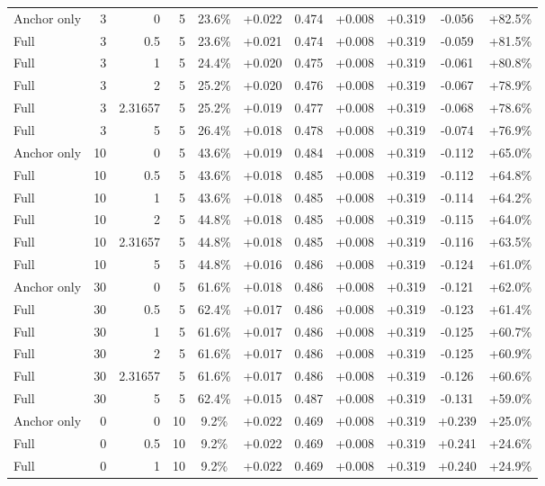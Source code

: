 \begin{table}[htbp]
\begin{tabular}{lrrrccccccc}
Anchor only & 3 & 0 & 5 & 23.6\% & +0.022 & 0.474 & +0.008 & +0.319 & -0.056 & +82.5\% \\
Full & 3 & 0.5 & 5 & 23.6\% & +0.021 & 0.474 & +0.008 & +0.319 & -0.059 & +81.5\% \\
Full & 3 & 1 & 5 & 24.4\% & +0.020 & 0.475 & +0.008 & +0.319 & -0.061 & +80.8\% \\
Full & 3 & 2 & 5 & 25.2\% & +0.020 & 0.476 & +0.008 & +0.319 & -0.067 & +78.9\% \\
Full & 3 & 2.31657 & 5 & 25.2\% & +0.019 & 0.477 & +0.008 & +0.319 & -0.068 & +78.6\% \\
Full & 3 & 5 & 5 & 26.4\% & +0.018 & 0.478 & +0.008 & +0.319 & -0.074 & +76.9\% \\
Anchor only & 10 & 0 & 5 & 43.6\% & +0.019 & 0.484 & +0.008 & +0.319 & -0.112 & +65.0\% \\
Full & 10 & 0.5 & 5 & 43.6\% & +0.018 & 0.485 & +0.008 & +0.319 & -0.112 & +64.8\% \\
Full & 10 & 1 & 5 & 43.6\% & +0.018 & 0.485 & +0.008 & +0.319 & -0.114 & +64.2\% \\
Full & 10 & 2 & 5 & 44.8\% & +0.018 & 0.485 & +0.008 & +0.319 & -0.115 & +64.0\% \\
Full & 10 & 2.31657 & 5 & 44.8\% & +0.018 & 0.485 & +0.008 & +0.319 & -0.116 & +63.5\% \\
Full & 10 & 5 & 5 & 44.8\% & +0.016 & 0.486 & +0.008 & +0.319 & -0.124 & +61.0\% \\
Anchor only & 30 & 0 & 5 & 61.6\% & +0.018 & 0.486 & +0.008 & +0.319 & -0.121 & +62.0\% \\
Full & 30 & 0.5 & 5 & 62.4\% & +0.017 & 0.486 & +0.008 & +0.319 & -0.123 & +61.4\% \\
Full & 30 & 1 & 5 & 61.6\% & +0.017 & 0.486 & +0.008 & +0.319 & -0.125 & +60.7\% \\
Full & 30 & 2 & 5 & 61.6\% & +0.017 & 0.486 & +0.008 & +0.319 & -0.125 & +60.9\% \\
Full & 30 & 2.31657 & 5 & 61.6\% & +0.017 & 0.486 & +0.008 & +0.319 & -0.126 & +60.6\% \\
Full & 30 & 5 & 5 & 62.4\% & +0.015 & 0.487 & +0.008 & +0.319 & -0.131 & +59.0\% \\
Anchor only & 0 & 0 & 10 & 9.2\% & +0.022 & 0.469 & +0.008 & +0.319 & +0.239 & +25.0\% \\
Full & 0 & 0.5 & 10 & 9.2\% & +0.022 & 0.469 & +0.008 & +0.319 & +0.241 & +24.6\% \\
Full & 0 & 1 & 10 & 9.2\% & +0.022 & 0.469 & +0.008 & +0.319 & +0.240 & +24.9\% \\

\end{tabular}
\end{table}
